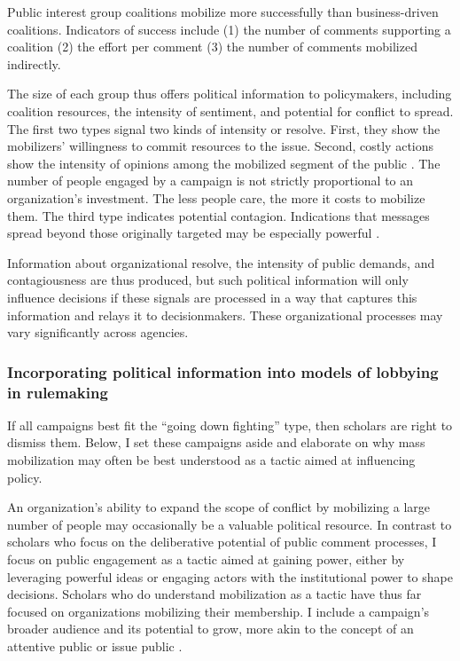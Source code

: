 \begin{subhyp}
\begin{hyp}
Public interest group coalitions mobilize more successfully than business-driven coalitions. Indicators of success include (1) the number of comments supporting a coalition (2) the effort per comment (3) the number of comments mobilized indirectly. 
\end{hyp}

\end{subhyp}

The size of each group thus offers political information to policymakers, including coalition resources, the intensity of sentiment, and potential for conflict to spread. The first two types signal two kinds of intensity or resolve. First, they show the mobilizers' willingness to commit resources to the issue. Second, costly actions show the intensity of opinions among the mobilized segment of the public \citep{Dunleavy1991}. The number of people engaged by a campaign is not strictly proportional to an organization's investment. The less people care, the more it costs to mobilize them. The third type indicates potential contagion. Indications that messages spread beyond those originally targeted may be especially powerful \citep{Kollman1998}. 

Information about organizational resolve, the intensity of public demands, and contagiousness are thus produced, but %
such political information will only influence decisions if these signals are processed in a way that captures this information and relays it to decisionmakers. These organizational processes may vary significantly across agencies.


\subsubsection{Incorporating political information into models of lobbying in rulemaking}
If all campaigns best fit the ``going down fighting'' type, then scholars are right to dismiss them. Below, I set these campaigns aside and elaborate on why mass mobilization may often be best understood as a tactic aimed at influencing policy.

An organization's ability to expand the scope of conflict by mobilizing a large number of people may occasionally be a valuable political resource. 
In contrast to scholars who focus on the deliberative potential of public comment processes, I focus on public engagement as a tactic aimed at gaining power, either by leveraging powerful ideas or engaging actors with the institutional power to shape decisions.
Scholars who do understand mobilization as a tactic \citep{Furlong1997, Kerwin2011} have thus far focused on organizations mobilizing their membership. %
I include a campaign's broader audience and its potential to grow, more akin to the concept of an attentive public \citep{Key1961} or issue public \citep{Converse1964}.

